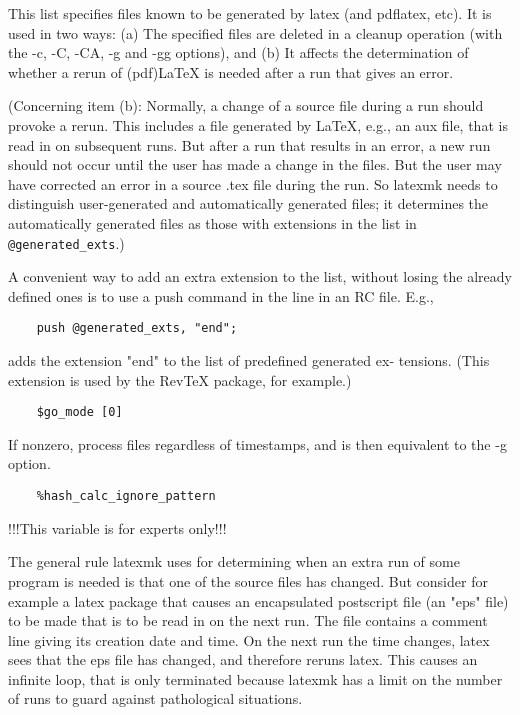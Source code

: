 This  list  specifies  files known to be generated by latex (and
pdflatex, etc).  It is used in two ways: (a) The specified files
are deleted in a cleanup operation (with the -c, -C, -CA, -g and
-gg options), and (b) It affects the determination of whether  a
rerun of (pdf)LaTeX is needed after a run that gives an error.

(Concerning item (b): Normally, a change of a source file during
a run should provoke a rerun.  This includes a file generated by
LaTeX,  e.g.,  an  aux file, that is read in on subsequent runs.
But after a run that results in an error, a new run  should  not
occur  until  the  user has made a change in the files.  But the user may have
corrected an error in a source  .tex  file  during the run.  So latexmk needs
to distinguish user-generated and automatically generated files;  it
determines  the  automatically generated  files as those with extensions in the
list in \verb|@generated_exts|.)

A convenient way to add an extra extension to the list,  without
losing  the already defined ones is to use a push command in the
line in an RC file.  E.g.,

\begin{verbatim}
	push @generated_exts, "end";
\end{verbatim}

adds the extension "end" to the list of predefined generated ex-
tensions.   (This  extension  is used by the RevTeX package, for
example.)

\begin{verbatim}
	$go_mode [0]
\end{verbatim}

If nonzero, process files regardless of timestamps, and is  then
equivalent to the -g option.

\begin{verbatim}
	%hash_calc_ignore_pattern
\end{verbatim}
!!!This variable is for experts only!!!

The  general rule latexmk uses for determining when an extra run
of some program is needed is that one of the  source  files  has
changed.   But  consider for example a latex package that causes
an encapsulated postscript file (an "eps" file) to be made  that
is  to  be read in on the next run.  The file contains a comment
line giving its creation date and time.  On  the  next  run  the
time  changes,  latex  sees  that  the eps file has changed, and
therefore reruns latex.  This causes an infinite loop,  that  is
only  terminated  because  latexmk  has a limit on the number of
runs to guard against pathological situations.

